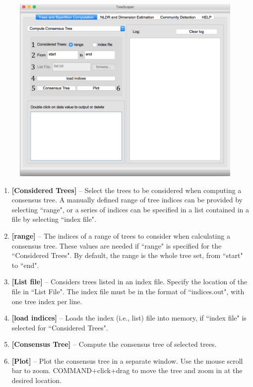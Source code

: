 \documentclass[11pt]{article}
\begin{document}
\begin{figure}[thbp!]\centering
\includegraphics[scale=0.4]{imagesForManual/Figure9_6_1_4.png}
\end{figure}

\begin{enumerate}[{\bf 1-}]
\item {\bf [Considered Trees]} --  Select the trees to be considered when computing a consensus tree. A
manually defined range of tree indices can be provided by selecting ``range", or a series of
indices can be specified in a list contained in a file by selecting ``index file".

\item {\bf [range]} -- The indices of a range of trees to consider when calculating a consensus tree.
These values are needed if ``range" is specified for the ``Considered Trees". By default, the
range is the whole tree set, from ``start" to ``end".

\item {\bf [List file]} -- Considers trees listed in an index file. Specify the location of the file in ``List
File". The index file must be in the format of ``indices.out", with one tree index per line.

\item {\bf [load indices]} -- Loads the index (i.e., list) file into memory, if ``index file" is selected for
``Considered Trees".

\item {\bf [Consensus Tree]} -- Compute the consensus tree of selected trees.

\item {\bf [Plot]} -- Plot the consensus tree in a separate window. Use the mouse scroll bar to zoom.
COMMAND$+$click$+$drag to move the tree and zoom in at the desired location.
\end{enumerate}
\end{document}
